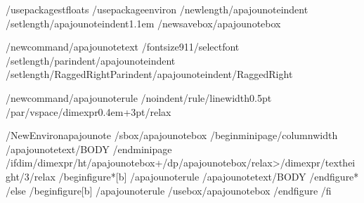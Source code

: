 %
%
%
%
/usepackage{stfloats}
/usepackage{environ}
/newlength{/apajounoteindent}
/setlength{/apajounoteindent}{1.1em}
/newsavebox{/apajounotebox}

/newcommand{/apajounotetext}{%
  /fontsize{9}{11}/selectfont
  /setlength{/parindent}{/apajounoteindent}%
  /setlength{/RaggedRightParindent}{/apajounoteindent}/RaggedRight}

/newcommand{/apajounoterule}{%
  /noindent/rule{/linewidth}{0.5pt}%
  /par/vspace{/dimexpr0.4em+3pt/relax}}

/NewEnviron{apajounote}{%
  /sbox{/apajounotebox}{%
    /begin{minipage}{/columnwidth}%
      /apajounotetext/BODY
    /end{minipage}}%
  /ifdim/dimexpr/ht/apajounotebox+/dp/apajounotebox/relax>/dimexpr/textheight/3/relax
    /begin{figure*}[b]%
      /apajounoterule
      /apajounotetext/BODY
    /end{figure*}%
  /else
    /begin{figure}[b]%
      /apajounoterule
      /usebox{/apajounotebox}%
    /end{figure}%
  /fi}

